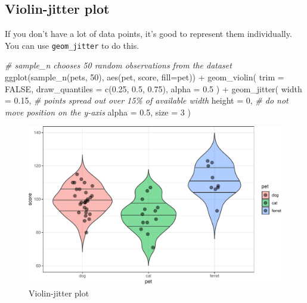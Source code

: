 \documentclass[
  oneside]{book}
\newenvironment{Shaded}{\begin{snugshade}}{\end{snugshade}}
\newcommand{\AttributeTok}[1]{\textcolor[rgb]{0.77,0.63,0.00}{#1}}
\newcommand{\CommentTok}[1]{\textcolor[rgb]{0.56,0.35,0.01}{\textit{#1}}}
\newcommand{\ConstantTok}[1]{\textcolor[rgb]{0.00,0.00,0.00}{#1}}
\newcommand{\DecValTok}[1]{\textcolor[rgb]{0.00,0.00,0.81}{#1}}
\newcommand{\FloatTok}[1]{\textcolor[rgb]{0.00,0.00,0.81}{#1}}
\newcommand{\FunctionTok}[1]{\textcolor[rgb]{0.00,0.00,0.00}{#1}}
\newcommand{\NormalTok}[1]{#1}
\newcommand{\SpecialCharTok}[1]{\textcolor[rgb]{0.00,0.00,0.00}{#1}}
\begin{document}
\hypertarget{violin-jitter-plot}{%
\subsection{Violin-jitter plot}\label{violin-jitter-plot}}

If you don't have a lot of data points, it's good to represent them individually. You can use \texttt{geom\_jitter} to do this.

\begin{Shaded}
\begin{Highlighting}[]
\CommentTok{\# sample\_n chooses 50 random observations from the dataset}
\FunctionTok{ggplot}\NormalTok{(}\FunctionTok{sample\_n}\NormalTok{(pets, }\DecValTok{50}\NormalTok{), }\FunctionTok{aes}\NormalTok{(pet, score, }\AttributeTok{fill=}\NormalTok{pet)) }\SpecialCharTok{+}
  \FunctionTok{geom\_violin}\NormalTok{(}
    \AttributeTok{trim =} \ConstantTok{FALSE}\NormalTok{,}
    \AttributeTok{draw\_quantiles =} \FunctionTok{c}\NormalTok{(}\FloatTok{0.25}\NormalTok{, }\FloatTok{0.5}\NormalTok{, }\FloatTok{0.75}\NormalTok{), }
    \AttributeTok{alpha =} \FloatTok{0.5}
\NormalTok{  ) }\SpecialCharTok{+} 
  \FunctionTok{geom\_jitter}\NormalTok{(}
    \AttributeTok{width =} \FloatTok{0.15}\NormalTok{, }\CommentTok{\# points spread out over 15\% of available width}
    \AttributeTok{height =} \DecValTok{0}\NormalTok{, }\CommentTok{\# do not move position on the y{-}axis}
    \AttributeTok{alpha =} \FloatTok{0.5}\NormalTok{, }
    \AttributeTok{size =} \DecValTok{3}
\NormalTok{  )}
\end{Highlighting}
\end{Shaded}

\begin{figure}

{\centering \includegraphics[width=0.9\linewidth]{images/violin-jitter-1} 

}

\caption{Violin-jitter plot}\label{fig:violin-jitter}
\end{figure}
\end{document}
